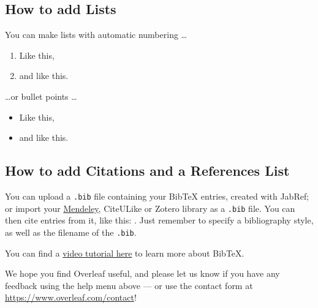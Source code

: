 \documentclass[a4paper]{article}
\begin{document}
\subsection{How to add Lists}

You can make lists with automatic numbering \dots

\begin{enumerate}
\item Like this,
\item and like this.
\end{enumerate}
\dots or bullet points \dots
\begin{itemize}
\item Like this,
\item and like this.
\end{itemize}

\subsection{How to add Citations and a References List}

You can upload a \verb|.bib| file containing your BibTeX entries, created with JabRef; or import your \href{https://www.overleaf.com/blog/184}{Mendeley}, CiteULike or Zotero library as a \verb|.bib| file. You can then cite entries from it, like this: \cite{greenwade93}. Just remember to specify a bibliography style, as well as the filename of the \verb|.bib|.

You can find a \href{https://www.overleaf.com/help/97-how-to-include-a-bibliography-using-bibtex}{video tutorial here} to learn more about BibTeX.

We hope you find Overleaf useful, and please let us know if you have any feedback using the help menu above --- or use the contact form at \url{https://www.overleaf.com/contact}!



\end{document}
